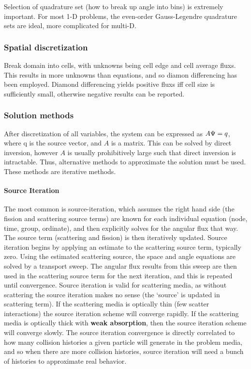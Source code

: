 Selection of quadrature set (how to break up angle into bins) is extremely important. For most 1-D problems, the even-order Gauss-Legendre quadrature sets are ideal, more complicated for multi-D. 

\subsubsection{Spatial discretization}
Break domain into cells, with unknowns being cell edge and cell average fluxs. This results in more unknowns than equations, and so diamon differencing has been employed. Diamond differencing yields positive fluxs iff cell size is sufficiently small, otherwise negative results can be reported. 

\subsubsection{Solution methods}
After discretization of all variables, the system can be expressed as $A\Psi=q$, where q is the source vector, and $A$ is a matrix. This can be solved by direct inversion, however $A$ is usually prohibitively large such that direct inversion is intractable. Thus, alternative methods to approximate the solution must be used. These methods are iterative methods. 

\paragraph{Source Iteration}
The most common is source-iteration, which assumes the right hand side (the fission and scattering source terms) are known for each individual equation (node, time, group, ordinate), and then explicitly solves for the angular flux that way. The source term (scattering and fission) is then iteratively updated. Source iteration begins by applying an estimate to the scattering source term, typically zero. Using the estimated scattering source, the space and angle equations are solved by a transport sweep. The angular flux results from this sweep are then used in the scattering source term for the next iteration, and this is repeated until convergence. Source iteration is valid for scattering media, as without scattering the source iteration makes no sense (the `source' is updated in scattering term). If the scattering media is optically thin (few scatter interactions) the source iteration scheme will converge rapidly. If the scattering media is optically thick with \textbf{weak absorption}, then the source iteration scheme will converge slowly. The source iteration convergence is directly correlated to how many collision histories a given particle will generate in the problem media, and so when there are more collision histories, source iteration will need a bunch of histories to approximate real behavior. 

